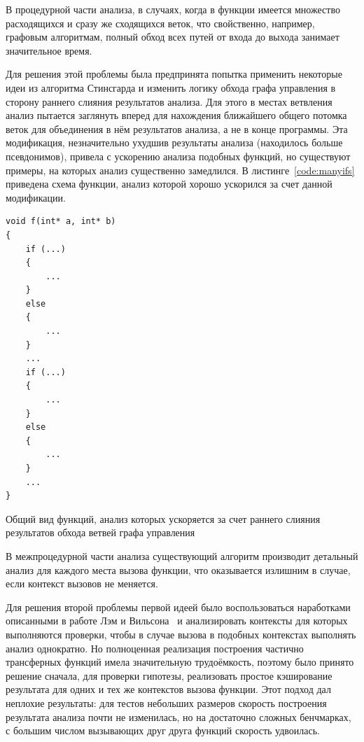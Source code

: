 В процедурной части анализа, в случаях, когда в функции имеется множество расходящихся и сразу же сходящихся веток, что свойственно, например, графовым алгоритмам, полный обход всех путей от входа до выхода занимает значительное время.

Для решения этой проблемы была предпринята попытка применить некоторые идеи из алгоритма Стинсгарда и изменить логику обхода графа управления в сторону раннего слияния результатов анализа. Для этого в местах ветвления анализ пытается заглянуть вперед для нахождения ближайшего общего потомка веток для объединения в нём результатов анализа, а не в конце программы. Эта модификация, незначительно ухудшив результаты анализа (находилось больше псевдонимов), привела с ускорению анализа подобных функций, но существуют примеры, на которых анализ существенно замедлился. В листинге~\ref{code:manyifs} приведена схема функции, анализ которой хорошо ускорился за счет данной модификации.

\begin{ListingEnv}[H]
\begin{lstlisting}
void f(int* a, int* b)
{
    if (...)
    {
        ...
    }
    else
    {
        ...
    }
    ...
    if (...)
    {
        ...
    }
    else
    {
        ...
    }
    ...
}
\end{lstlisting}
\caption{Общий вид функций, анализ которых ускоряется за счет раннего слияния результатов обхода ветвей графа управления}
\label{code:manyifs}
\end{ListingEnv}

В межпроцедурной части анализа существующий алгоритм производит детальный анализ для каждого места вызова функции, что оказывается излишним в случае, если контекст вызовов не меняется.

Для решения второй проблемы первой идеей было воспользоваться наработками описанными в работе Лэм и Вильсона~\autocite{WilsonLamSIGPLAN95} и анализировать контексты для которых выполняются проверки, чтобы в случае вызова в подобных контекстах выполнять анализ однократно. Но полноценная реализация построения частично трансферных функций имела значительную трудоёмкость, поэтому было принято решение сначала, для проверки гипотезы, реализовать простое кэширование результата для одних и тех же контекстов вызова функции. Этот подход дал неплохие результаты: для тестов небольших размеров скорость построения результата анализа почти не изменилась, но на достаточно сложных бенчмарках, с большим числом вызывающих друг друга функций скорость удвоилась.

